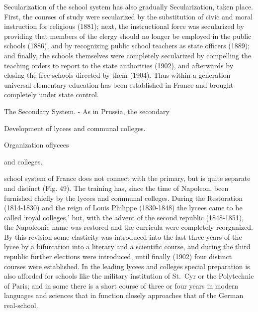 \documentclass[
]{book}
\begin{document}
Secularization of the school system has also gradually Secularization, taken place. First, the courses of study were secularized by the substitution of civic and moral instruction for religious (1881); next, the instructional force was secularized by providing that members of the clergy should no longer be employed in the public schools (1886), and by recognizing public school teachers as state officers (1889); and finally, the schools themselves were completely secularized by compelling the teaching orders to report to the state authorities (1902), and afterwards by closing the free schools directed by them (1904). Thus within a generation universal elementary education has been established in France and brought completely under state control.

The Secondary System. - As in Prussia, the secondary

Development of lycees and communal colleges.

Organization oflycees

and colleges.

school system of France does not connect with the primary, but is quite separate and distinct (Fig. 49). The training has, since the time of Napoleon, been furnished chiefly by the lycees and communal colleges. During the Restoration (1814-1830) and the reign of Louis Philippe (1830-1848) the lycees came to be called `royal colleges,' but, with the advent of the second republic (1848-1851), the Napoleonic name was restored and the curricula were completely reorganized. By this revision some elasticity was introduced into the last three years of the lycee by a bifurcation into a literary and a scientific course, and during the third republic further elections were introduced, until finally (1902) four distinct courses were established. In the leading lycees and colleges special preparation is also afforded for schools like the military institution of St.~Cyr or the Polytechnic of Paris; and in some there is a short course of three or four years in modern languages and sciences that in function closely approaches that of the German real-school.
\end{document}
